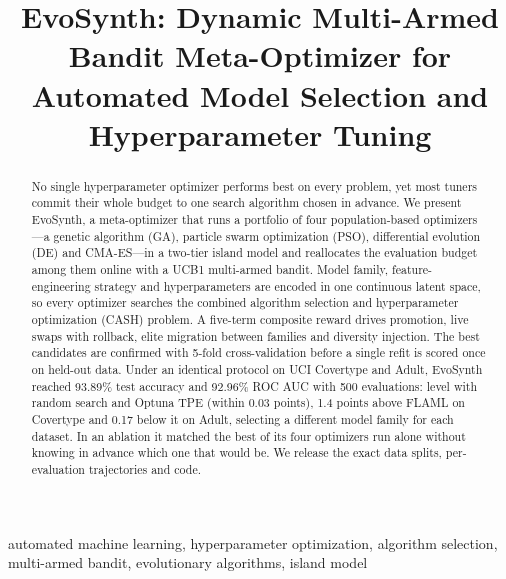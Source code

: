 \documentclass[conference]{IEEEtran}
\begin{document}
\title{EvoSynth: Dynamic Multi-Armed Bandit Meta-Optimizer for Automated Model Selection and Hyperparameter Tuning}

\author{
}

\maketitle

\begin{abstract}
No single hyperparameter optimizer performs best on every problem, yet most tuners commit their whole budget to one search algorithm chosen in advance. We present EvoSynth, a meta-optimizer that runs a portfolio of four population-based optimizers---a genetic algorithm (GA), particle swarm optimization (PSO), differential evolution (DE) and CMA-ES---in a two-tier island model and reallocates the evaluation budget among them online with a UCB1 multi-armed bandit. Model family, feature-engineering strategy and hyperparameters are encoded in one continuous latent space, so every optimizer searches the combined algorithm selection and hyperparameter optimization (CASH) problem. A five-term composite reward drives promotion, live swaps with rollback, elite migration between families and diversity injection. The best candidates are confirmed with 5-fold cross-validation before a single refit is scored once on held-out data. Under an identical protocol on UCI Covertype and Adult, EvoSynth reached 93.89\% test accuracy and 92.96\% ROC AUC with 500 evaluations: level with random search and Optuna TPE (within 0.03 points), 1.4 points above FLAML on Covertype and 0.17 below it on Adult, selecting a different model family for each dataset. In an ablation it matched the best of its four optimizers run alone without knowing in advance which one that would be. We release the exact data splits, per-evaluation trajectories and code.
\end{abstract}

\begin{IEEEkeywords}
automated machine learning, hyperparameter optimization, algorithm selection, multi-armed bandit, evolutionary algorithms, island model
\end{IEEEkeywords}
\end{document}
